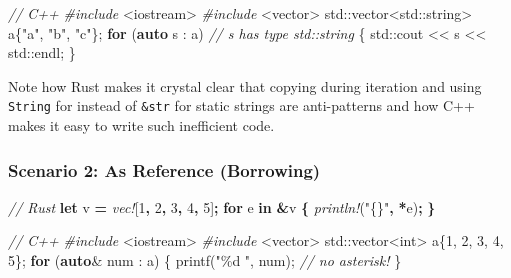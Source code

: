 \documentclass[
]{book}
\newenvironment{Shaded}{\begin{snugshade}}{\end{snugshade}}
\newcommand{\BuiltInTok}[1]{#1}
\newcommand{\CommentTok}[1]{\textcolor[rgb]{0.56,0.35,0.01}{\textit{#1}}}
\newcommand{\ControlFlowTok}[1]{\textcolor[rgb]{0.13,0.29,0.53}{\textbf{#1}}}
\newcommand{\DataTypeTok}[1]{\textcolor[rgb]{0.13,0.29,0.53}{#1}}
\newcommand{\DecValTok}[1]{\textcolor[rgb]{0.00,0.00,0.81}{#1}}
\newcommand{\ImportTok}[1]{#1}
\newcommand{\KeywordTok}[1]{\textcolor[rgb]{0.13,0.29,0.53}{\textbf{#1}}}
\newcommand{\NormalTok}[1]{#1}
\newcommand{\OperatorTok}[1]{\textcolor[rgb]{0.81,0.36,0.00}{\textbf{#1}}}
\newcommand{\PreprocessorTok}[1]{\textcolor[rgb]{0.56,0.35,0.01}{\textit{#1}}}
\newcommand{\SpecialCharTok}[1]{\textcolor[rgb]{0.00,0.00,0.00}{#1}}
\newcommand{\StringTok}[1]{\textcolor[rgb]{0.31,0.60,0.02}{#1}}
\begin{document}
\begin{Shaded}
\begin{Highlighting}[]
\CommentTok{// C++}
\PreprocessorTok{\#include }\ImportTok{\textless{}iostream\textgreater{}}
\PreprocessorTok{\#include }\ImportTok{\textless{}vector\textgreater{}}
\BuiltInTok{std::}\NormalTok{vector\textless{}}\BuiltInTok{std::}\NormalTok{string\textgreater{} a\{}\StringTok{"a"}\NormalTok{, }\StringTok{"b"}\NormalTok{, }\StringTok{"c"}\NormalTok{\};}
\ControlFlowTok{for}\NormalTok{ (}\KeywordTok{auto}\NormalTok{ s : a) }\CommentTok{// s has type \textasciigrave{}std::string\textasciigrave{}}
\NormalTok{\{}
    \BuiltInTok{std::}\NormalTok{cout \textless{}\textless{} s \textless{}\textless{} }\BuiltInTok{std::}\NormalTok{endl;}
\NormalTok{\}}
\end{Highlighting}
\end{Shaded}

Note how Rust makes it crystal clear that copying during iteration and using \texttt{String} for instead of \texttt{\&str} for static strings are anti-patterns and how C++ makes it easy to write such inefficient code.

\hypertarget{scenario-2-as-reference-borrowing}{%
\subsubsection{Scenario 2: As Reference (Borrowing)}\label{scenario-2-as-reference-borrowing}}

\begin{Shaded}
\begin{Highlighting}[]
\CommentTok{// Rust}
\KeywordTok{let}\NormalTok{ v }\OperatorTok{=} \PreprocessorTok{vec!}\NormalTok{[}\DecValTok{1}\OperatorTok{,} \DecValTok{2}\OperatorTok{,} \DecValTok{3}\OperatorTok{,} \DecValTok{4}\OperatorTok{,} \DecValTok{5}\NormalTok{]}\OperatorTok{;}
\KeywordTok{for}\NormalTok{ e }\KeywordTok{in} \OperatorTok{\&}\NormalTok{v }\OperatorTok{\{}
    \PreprocessorTok{println!}\NormalTok{(}\StringTok{"\{\}"}\OperatorTok{,} \OperatorTok{*}\NormalTok{e)}\OperatorTok{;}
\OperatorTok{\}}
\end{Highlighting}
\end{Shaded}

\begin{Shaded}
\begin{Highlighting}[]
\CommentTok{// C++}
\PreprocessorTok{\#include }\ImportTok{\textless{}iostream\textgreater{}}
\PreprocessorTok{\#include }\ImportTok{\textless{}vector\textgreater{}}
\BuiltInTok{std::}\NormalTok{vector\textless{}}\DataTypeTok{int}\NormalTok{\textgreater{} a\{}\DecValTok{1}\NormalTok{, }\DecValTok{2}\NormalTok{, }\DecValTok{3}\NormalTok{, }\DecValTok{4}\NormalTok{, }\DecValTok{5}\NormalTok{\};}
\ControlFlowTok{for}\NormalTok{ (}\KeywordTok{auto}\NormalTok{\& num : a)}
\NormalTok{\{}
\NormalTok{    printf(}\StringTok{"}\SpecialCharTok{\%d}\StringTok{ "}\NormalTok{, num); }\CommentTok{// no asterisk!}
\NormalTok{\}}
\end{Highlighting}
\end{Shaded}
\end{document}
